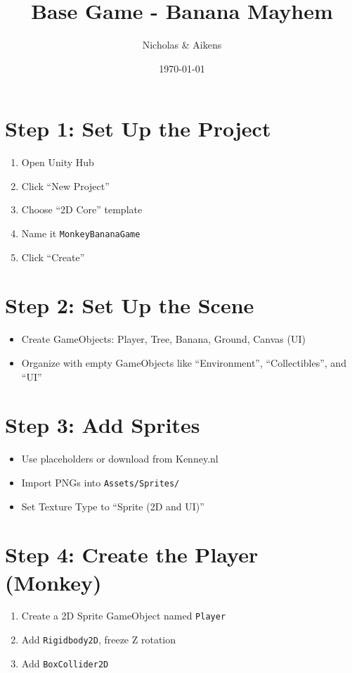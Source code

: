 \documentclass[11pt]{article}
\title{Base Game - Banana Mayhem}
\author{Nicholas \& Aikens}
\date{\today}
\begin{document}
	
	\section*{Step 1: Set Up the Project}
	\begin{enumerate}
		\item Open Unity Hub
		\item Click “New Project”
		\item Choose “2D Core” template
		\item Name it \texttt{MonkeyBananaGame}
		\item Click “Create”
	\end{enumerate}
	
	\section*{Step 2: Set Up the Scene}
	\begin{itemize}
		\item Create GameObjects: Player, Tree, Banana, Ground, Canvas (UI)
		\item Organize with empty GameObjects like “Environment”, “Collectibles”, and “UI”
	\end{itemize}
	
	\section*{Step 3: Add Sprites}
	\begin{itemize}
		\item Use placeholders or download from Kenney.nl
		\item Import PNGs into \texttt{Assets/Sprites/}
		\item Set Texture Type to “Sprite (2D and UI)”
	\end{itemize}
	
	\section*{Step 4: Create the Player (Monkey)}
	\begin{enumerate}
		\item Create a 2D Sprite GameObject named \texttt{Player}
		\item Add \texttt{Rigidbody2D}, freeze Z rotation
		\item Add \texttt{BoxCollider2D}
	\end{enumerate}
	
\end{document}
